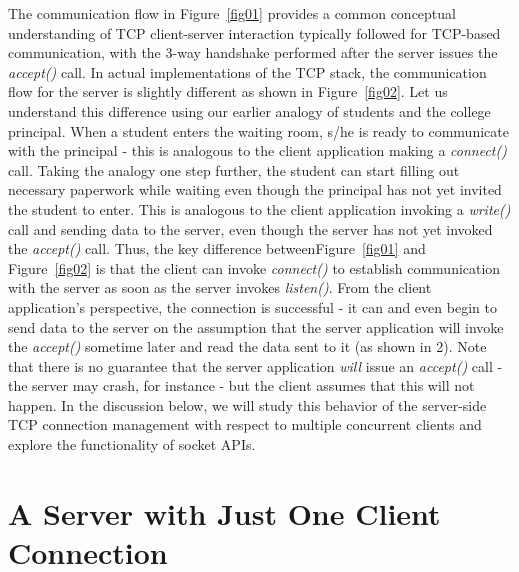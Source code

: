 \begin{multicols}{2}
\begin{figure}[H]
\vspace{-.4cm}

\end{figure}

The communication flow in Figure~\ref{fig01} provides a common conceptual understanding of TCP client-server interaction typically followed for TCP-based communication, with the 3-way handshake performed after the server issues the \textit{accept()} call. In actual implementations of the TCP stack, the communication flow for the server is slightly different as shown in Figure~\ref{fig02}. Let us understand this difference using our earlier analogy of students and the college principal. When a student enters the waiting room, s/he is ready to communicate with the principal - this is analogous to the client application making a \textit{connect()} call. Taking the analogy one step further, the student can start filling out necessary paperwork while waiting even though the principal has not yet invited the student to enter. This is analogous to the client application invoking a \textit{write()} call and sending data to the server, even though the server has not yet invoked the \textit{accept()} call. Thus, the key difference between\break Figure~\ref{fig01} and Figure~\ref{fig02} is that the client can invoke \textit{connect()} to establish communication with the server as soon as the server invokes \textit{listen()}. From the client application’s perspective, the connection is successful - it can and even begin to send data to the server on the assumption that the server application will invoke the \textit{accept()} sometime later and read the data sent to it (as shown in 2). Note that there is no guarantee that the server application \textit{will} issue an \textit{accept()} call - the server may crash, for instance - but the client assumes that this will not happen. In the discussion below, we will study this behavior of the server-side TCP connection management with respect to multiple concurrent clients and explore the functionality of socket APIs.

\vspace{-.5cm}

\section{A Server with Just One Client\\ Connection}


\end{multicols}
